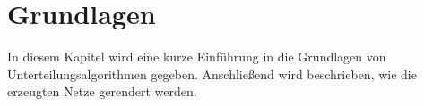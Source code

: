 \chapter{Grundlagen}

In diesem Kapitel wird eine kurze Einführung in die Grundlagen von Unterteilungsalgorithmen gegeben.
Anschließend wird beschrieben, wie die erzeugten Netze gerendert werden.






